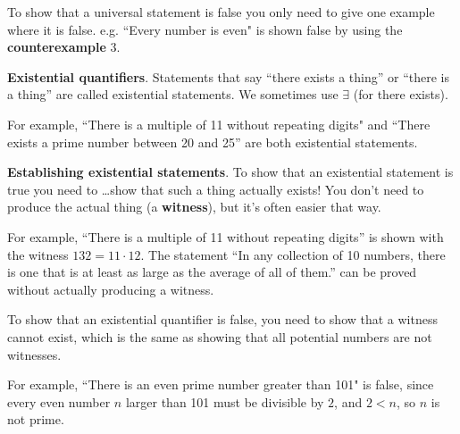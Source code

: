 \documentclass[11pt]{article}
\theoremstyle{definition}
\numberwithin{thm}{section}
\begin{document}
To show that a universal statement is false you only need to give one example where it is false. e.g. ``Every number is even" is shown false by using the \textbf{counterexample} $3$.

\textbf{Existential quantifiers}. Statements that say ``there exists a thing'' or ``there is a thing'' are called existential statements. We sometimes use $\exists$ (for there exists).

For example, ``There is a multiple of 11 without repeating digits" and ``There exists a prime number between 20 and 25'' are both existential statements.

\textbf{Establishing existential statements}. To show that an existential statement is true you need to \ldots show that such a thing actually exists! You don't need to produce the actual thing (a \textbf{witness}), but it's often easier that way.

For example, ``There is a multiple of 11 without repeating digits'' is shown with the witness $132 = 11 \cdot 12$. The statement ``In any collection of 10 numbers, there is one that is at least as large as the average of all of them.'' can be proved without actually producing a witness.

To show that an existential quantifier is false, you need to show that a witness cannot exist, which is the same as showing that all potential numbers are not witnesses.

For example, ``There is an even prime number greater than 101" is false, since every even number $n$ larger than 101 must be divisible by $2$, and $2<n$, so $n$ is not prime.
\end{document}
